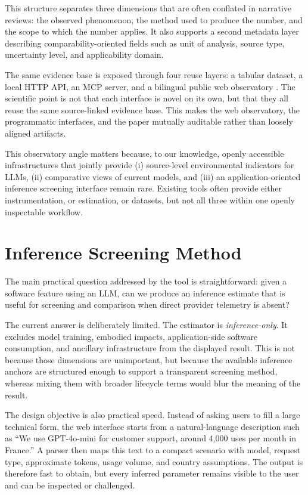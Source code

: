 \documentclass[10pt,a4paper]{article}
\begin{document}
This structure separates three dimensions that are often conflated in narrative reviews: the observed phenomenon, the method used to produce the number, and the scope to which the number applies. It also supports a second metadata layer describing comparability-oriented fields such as unit of analysis, source type, uncertainty level, and applicability domain.

The same evidence base is exposed through four reuse layers: a tabular dataset, a local HTTP API, an MCP server, and a bilingual public web observatory \cite{impactllmrepo2026}. The scientific point is not that each interface is novel on its own, but that they all reuse the same source-linked evidence base. This makes the web observatory, the programmatic interfaces, and the paper mutually auditable rather than loosely aligned artifacts.

This observatory angle matters because, to our knowledge, openly accessible infrastructures that jointly provide (i) source-level environmental indicators for LLMs, (ii) comparative views of current models, and (iii) an application-oriented inference screening interface remain rare. Existing tools often provide either instrumentation, or estimation, or datasets, but not all three within one openly inspectable workflow.

\section{Inference Screening Method}
The main practical question addressed by the tool is straightforward: given a software feature using an LLM, can we produce an inference estimate that is useful for screening and comparison when direct provider telemetry is absent?

The current answer is deliberately limited. The estimator is \emph{inference-only}. It excludes model training, embodied impacts, application-side software consumption, and ancillary infrastructure from the displayed result. This is not because those dimensions are unimportant, but because the available inference anchors are structured enough to support a transparent screening method, whereas mixing them with broader lifecycle terms would blur the meaning of the result.

The design objective is also practical speed. Instead of asking users to fill a large technical form, the web interface starts from a natural-language description such as ``We use GPT-4o-mini for customer support, around 4{,}000 uses per month in France.'' A parser then maps this text to a compact scenario with model, request type, approximate tokens, usage volume, and country assumptions. The output is therefore fast to obtain, but every inferred parameter remains visible to the user and can be inspected or challenged.
\end{document}

